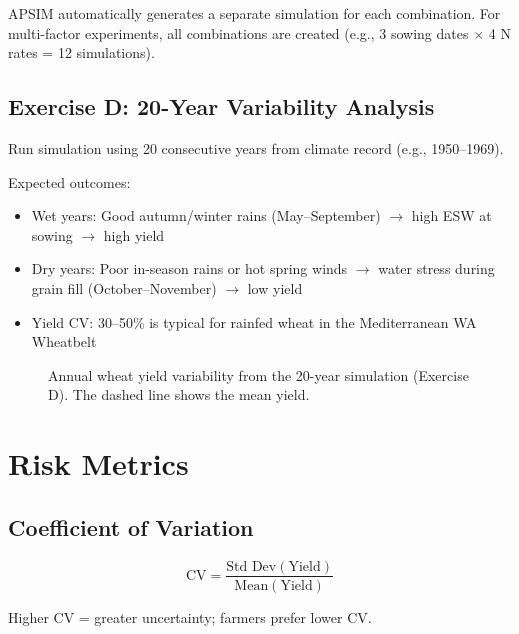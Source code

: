 APSIM automatically generates a separate simulation for each combination. For multi-factor experiments, all combinations are created (e.g., 3 sowing dates $\times$ 4 N rates = 12 simulations).

\subsection{Exercise D: 20-Year Variability Analysis}

Run simulation using 20 consecutive years from climate record (e.g., 1950--1969).

Expected outcomes:
\begin{itemize}
  \item Wet years: Good autumn/winter rains (May--September) $\to$ high ESW at sowing $\to$ high yield
  \item Dry years: Poor in-season rains or hot spring winds $\to$ water stress during grain fill (October--November) $\to$ low yield
  \item Yield CV: 30--50\% is typical for rainfed wheat in the Mediterranean WA Wheatbelt
\end{itemize}

\begin{figure}[H]
  \centering
  \caption{Annual wheat yield variability from the 20-year simulation (Exercise D). The dashed line shows the mean yield.}
  \label{fig:yield-variability}
\end{figure}

\section{Risk Metrics}

\subsection{Coefficient of Variation}

\[
\text{CV} = \frac{\text{Std Dev}(\text{Yield})}{\text{Mean}(\text{Yield})}
\]

Higher CV = greater uncertainty; farmers prefer lower CV.

